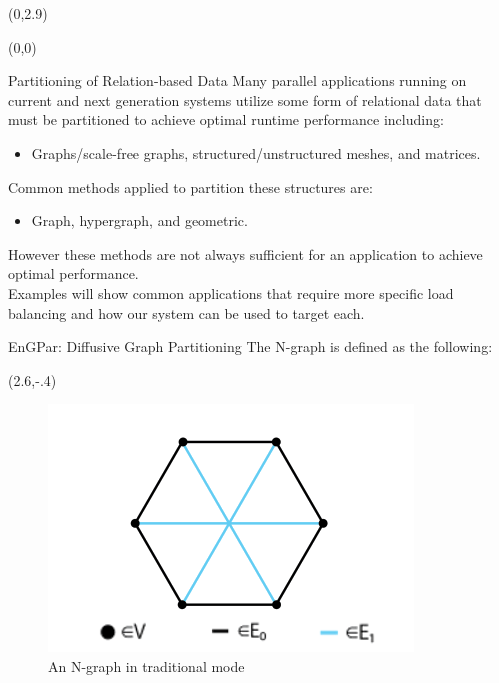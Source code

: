 \documentclass{beamer}
\begin{document}
\begin{textblock}{15.6}(0,2.9)
  \begin{textblock}{5.1}(0,0)
    \begin{block}{\centering Partitioning of Relation-based Data}
      Many parallel applications running on current and next generation systems utilize some form of relational data that must be partitioned to achieve optimal runtime performance including:
      \begin{itemize}
      \item Graphs/scale-free graphs, structured/unstructured meshes, and matrices.
      \end{itemize}
      Common methods applied to partition these structures are:
      \begin{itemize}
      \item Graph, hypergraph, and geometric.
      \end{itemize}
      However these methods are not always sufficient for an application to achieve optimal performance. \\Examples will show common applications that require more specific load balancing and how our system can be used to target each.
    \end{block}
    \begin{block}{\centering EnGPar: Diffusive Graph Partitioning}
      The N-graph is defined as the following:
      \begin{textblock}{2.5}(2.6,-.4)
        \begin{figure}
          \centering
          \includegraphics[width = \textwidth]{../figures/Ngraph.png}
          \caption{An N-graph in traditional mode}
        \end{figure}

\end{textblock}
\end{block}
\end{textblock}
\end{textblock}
\end{document}
